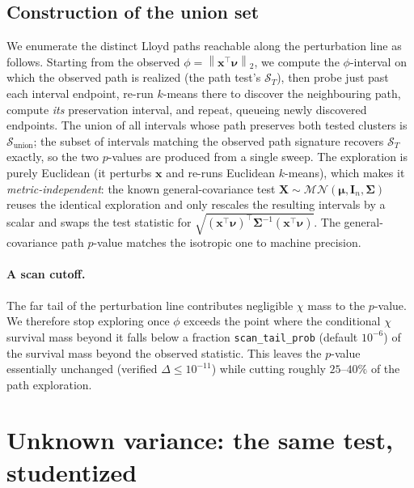 \documentclass[11pt]{article}
\newcommand{\X}{\mathbf{X}}
\newcommand{\x}{\mathbf{x}}
\newcommand{\bmu}{\bm{\mu}}
\newcommand{\bnu}{\bm{\nu}}
\newcommand{\Sset}{\mathcal{S}}
\newcommand{\norm}[1]{\left\lVert #1 \right\rVert}
\begin{document}
\subsection{Construction of the union set}
We enumerate the distinct Lloyd paths reachable along the perturbation line as
follows. Starting from the observed $\phi=\norm{\x^\top\bnu}_2$, we compute the
$\phi$-interval on which the observed path is realized (the path test's
$\Sset_T$), then probe just past each interval endpoint, re-run $k$-means there
to discover the neighbouring path, compute \emph{its} preservation interval, and
repeat, queueing newly discovered endpoints. The union of all intervals whose
path preserves both tested clusters is $\Sset_{\mathrm{union}}$; the subset of
intervals matching the observed path signature recovers $\Sset_T$ exactly, so the
two $p$-values are produced from a single sweep. The exploration is purely
Euclidean (it perturbs $\x$ and re-runs Euclidean $k$-means), which makes it
\emph{metric-independent}: the known general-covariance test
$\X\sim\mathcal{MN}(\bmu,\mathbf I_n,\bm\Sigma)$ reuses the identical exploration
and only rescales the resulting intervals by a scalar and swaps the test
statistic for $\sqrt{(\x^\top\bnu)^\top\bm\Sigma^{-1}(\x^\top\bnu)}$. The
general-covariance path $p$-value matches the isotropic one to machine precision.

\paragraph{A scan cutoff.} The far tail of the perturbation line contributes
negligible $\chi$ mass to the $p$-value. We therefore stop exploring once $\phi$
exceeds the point where the conditional $\chi$ survival mass beyond it falls below
a fraction \texttt{scan\_tail\_prob} (default $10^{-6}$) of the survival mass
beyond the observed statistic. This leaves the $p$-value essentially unchanged
(verified $\Delta \le 10^{-11}$) while cutting roughly $25$--$40\%$ of the path
exploration.

\section{Unknown variance: the same test, studentized}
\label{sec:rfiber}
\end{document}
